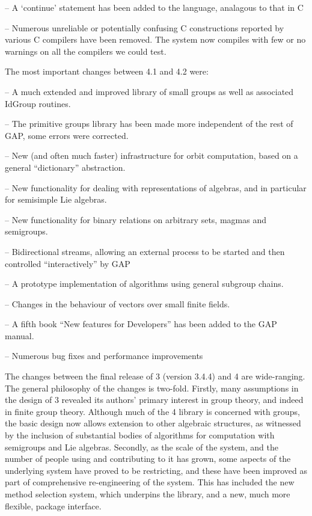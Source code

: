 \item{--}
A `continue' statement has been added to the {\GAP} language,
analagous to that in C

\item{--} 
Numerous unreliable or potentially confusing C constructions reported
by various C compilers have been removed. The system now compiles with
few or no warnings on all the compilers we could test.
\endlist


The most important changes between {\GAP} 4.1 and {\GAP} 4.2 were:

\beginlist%
\item{--}
A much extended and improved library of small groups as well as
associated IdGroup routines.

\item{--}
The primitive groups library has been made more independent of the
rest of GAP, some errors were corrected.

\item{--}
New (and often much faster) infrastructure for orbit computation, based on a
general ``dictionary'' abstraction.

\item{--}
New functionality for dealing with representations of algebras, and
in particular for semisimple Lie algebras. 

\item{--}
New functionality for binary relations on arbitrary sets, magmas and
semigroups.

\item{--}
Bidirectional streams, allowing an external process to be started and then
controlled ``interactively'' by GAP 

\item{--}
A prototype implementation of algorithms using general subgroup chains.

\item{--}
Changes in the behaviour of vectors over small finite fields.

\item{--}
A fifth book ``New features for Developers'' has been added to the GAP manual.

\item{--}
Numerous bug fixes and performance improvements 
\endlist


The changes between the final release of {\GAP} 3 (version 3.4.4) and
{\GAP} 4 are  wide-ranging.  The general philosophy of the
changes is two-fold.  Firstly, many assumptions in the design of
{\GAP} 3 revealed its authors' primary interest in group theory, and
indeed in finite group theory. Although much of the {\GAP} 4 library
is concerned with groups, the basic design now allows extension to
other algebraic structures, as witnessed by the inclusion of
substantial bodies of algorithms for computation with semigroups and
Lie algebras.  Secondly, as the scale of the system, and the number of
people using and contributing to it has grown, some aspects of the
underlying system have proved to be restricting, and these have been
improved as part of comprehensive re-engineering of the system. This
has included the new method selection system, which underpins the
library, and a new, much more flexible, {\GAP} package interface.

